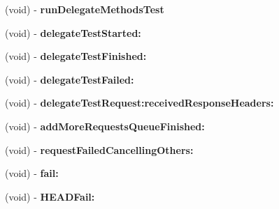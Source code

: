 \begin{DoxyCompactItemize}
\item 
\hypertarget{interface_a_s_i_network_queue_tests_07_08_aac272d1e4ebf8932ab723637f3abe58c}{
(void) -\/ {\bfseries run\-Delegate\-Methods\-Test}}
\label{interface_a_s_i_network_queue_tests_07_08_aac272d1e4ebf8932ab723637f3abe58c}

\item 
\hypertarget{interface_a_s_i_network_queue_tests_07_08_ad63bd013de90e522e12f2bba603c20d7}{
(void) -\/ {\bfseries delegate\-Test\-Started\-:}}
\label{interface_a_s_i_network_queue_tests_07_08_ad63bd013de90e522e12f2bba603c20d7}

\item 
\hypertarget{interface_a_s_i_network_queue_tests_07_08_aa05a6ec84d2a71b363573187e70a6afa}{
(void) -\/ {\bfseries delegate\-Test\-Finished\-:}}
\label{interface_a_s_i_network_queue_tests_07_08_aa05a6ec84d2a71b363573187e70a6afa}

\item 
\hypertarget{interface_a_s_i_network_queue_tests_07_08_a3b74243c00c86e888ffc9cb271138dcb}{
(void) -\/ {\bfseries delegate\-Test\-Failed\-:}}
\label{interface_a_s_i_network_queue_tests_07_08_a3b74243c00c86e888ffc9cb271138dcb}

\item 
\hypertarget{interface_a_s_i_network_queue_tests_07_08_a46a23624618c0547cbcbb9ca82c798cb}{
(void) -\/ {\bfseries delegate\-Test\-Request\-:received\-Response\-Headers\-:}}
\label{interface_a_s_i_network_queue_tests_07_08_a46a23624618c0547cbcbb9ca82c798cb}

\item 
\hypertarget{interface_a_s_i_network_queue_tests_07_08_abe54bb28f6c58b48f2e136adebe7591c}{
(void) -\/ {\bfseries add\-More\-Requests\-Queue\-Finished\-:}}
\label{interface_a_s_i_network_queue_tests_07_08_abe54bb28f6c58b48f2e136adebe7591c}

\item 
\hypertarget{interface_a_s_i_network_queue_tests_07_08_ac13a2a0cfd430c066079f46e968de949}{
(void) -\/ {\bfseries request\-Failed\-Cancelling\-Others\-:}}
\label{interface_a_s_i_network_queue_tests_07_08_ac13a2a0cfd430c066079f46e968de949}

\item 
\hypertarget{interface_a_s_i_network_queue_tests_07_08_a672f203e09f2d4f39fb2f1824cd85443}{
(void) -\/ {\bfseries fail\-:}}
\label{interface_a_s_i_network_queue_tests_07_08_a672f203e09f2d4f39fb2f1824cd85443}

\item 
\hypertarget{interface_a_s_i_network_queue_tests_07_08_abebd73c6087a317cf7d40a0694fa0554}{
(void) -\/ {\bfseries \-H\-E\-A\-D\-Fail\-:}}
\label{interface_a_s_i_network_queue_tests_07_08_abebd73c6087a317cf7d40a0694fa0554}


\end{DoxyCompactItemize}
